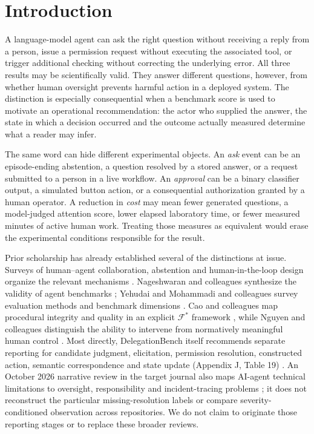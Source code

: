 \section{Introduction}
A language-model agent can ask the right question without receiving a reply from a person, issue a permission request without executing the associated tool, or trigger additional checking without correcting the underlying error. All three results may be scientifically valid. They answer different questions, however, from whether human oversight prevents harmful action in a deployed system. The distinction is especially consequential when a benchmark score is used to motivate an operational recommendation: the actor who supplied the answer, the state in which a decision occurred and the outcome actually measured determine what a reader may infer.

The same word can hide different experimental objects. An \emph{ask} event can be an episode-ending abstention, a question resolved by a stored answer, or a request submitted to a person in a live workflow. An \emph{approval} can be a binary classifier output, a simulated button action, or a consequential authorization granted by a human operator. A reduction in \emph{cost} may mean fewer generated questions, a model-judged attention score, lower elapsed laboratory time, or fewer measured minutes of active human work. Treating those measures as equivalent would erase the experimental conditions responsible for the result.

Prior scholarship has already established several of the distinctions at issue. Surveys of human--agent collaboration, abstention and human-in-the-loop design organize the relevant mechanisms \cite{ref1,ref3,ref4,ref5}. Nageshwaran and colleagues synthesize the validity of agent benchmarks \cite{ref2}; Yehudai and Mohammadi and colleagues survey evaluation methods and benchmark dimensions \cite{ref7,ref8}. Cao and colleagues map procedural integrity and quality in an explicit $\mathcal{F}^{*}$ framework \cite{ref9}, while Nguyen and colleagues distinguish the ability to intervene from normatively meaningful human control \cite{ref39}. Most directly, DelegationBench itself recommends separate reporting for candidate judgment, elicitation, permission resolution, constructed action, semantic correspondence and state update (Appendix J, Table 19) \cite{ref12}. An October 2026 narrative review in the target journal also maps AI-agent technical limitations to oversight, responsibility and incident-tracing problems \cite{ref48}; it does not reconstruct the particular missing-resolution labels or compare severity-conditioned observation across repositories. We do not claim to originate those reporting stages or to replace these broader reviews.

